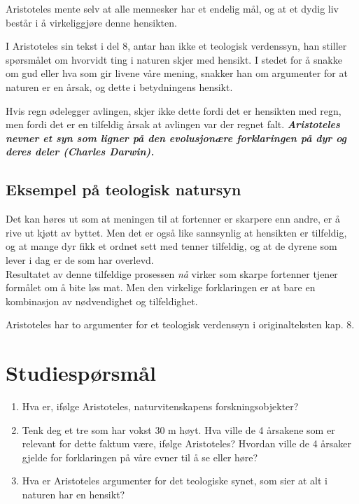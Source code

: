 \documentclass[11pt, a4paper]{article}
\begin{document}
Aristoteles mente selv at alle mennesker har et endelig mål, og at et dydig liv består i å virkeliggjøre denne hensikten.

I Aristoteles sin tekst i del 8, antar han ikke et teologisk verdenssyn, han stiller spørsmålet om hvorvidt ting i naturen skjer med hensikt. I stedet for å snakke om gud eller hva som gir livene våre mening, snakker han om argumenter for at naturen er en årsak, og dette i betydningens hensikt.


Hvis regn ødelegger avlingen, skjer ikke dette fordi det er hensikten med regn, men fordi det er en tilfeldig årsak at avlingen var der regnet falt. \textbf{\textit{Aristoteles nevner et syn som ligner på den evolusjonære forklaringen på dyr og deres deler (Charles Darwin).}}\\



\subsection{Eksempel på teologisk natursyn}


Det kan høres ut som at meningen til at fortenner er skarpere enn andre, er å rive ut kjøtt av byttet. Men det er også like sannsynlig at hensikten er tilfeldig, og at mange dyr fikk et ordnet sett med tenner tilfeldig, og at de dyrene som lever i dag er de som har overlevd.\\

Resultatet av denne tilfeldige prosessen \textit{nå} virker som skarpe fortenner tjener formålet om å bite løs mat. Men den virkelige forklaringen er at bare en kombinasjon av nødvendighet og tilfeldighet.


Aristoteles har to argumenter for et teologisk verdenssyn i originalteksten kap. 8.



\section{Studiespørsmål}

\begin{enumerate}
    \item Hva er, ifølge Aristoteles, naturvitenskapens forskningsobjekter?
    \item Tenk deg et tre som har vokst 30 m høyt. Hva ville de 4 årsakene som er relevant for dette faktum være, ifølge Aristoteles? Hvordan ville de 4 årsaker gjelde for forklaringen på våre evner til å se eller høre?
    \item Hva er Aristoteles argumenter for det teologiske synet, som sier at alt i naturen har en hensikt?
\end{enumerate}
\end{document}
